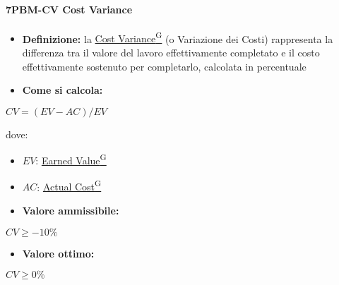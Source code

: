 \paragraph*{7PBM-CV Cost Variance}
\begin{itemize}
    \item \textbf{Definizione:} la \href{https://code7crusaders.github.io/docs/RTB/documentazione_interna/glossario.html#cost-variance}{Cost Variance\textsuperscript{G}} (o Variazione dei Costi) rappresenta la differenza tra il valore del lavoro effettivamente completato e il costo effettivamente sostenuto per completarlo, calcolata in percentuale
    \item \textbf{Come si calcola:}
\end{itemize}
\begin{center}
   $CV = (EV - AC)/EV$ 
\end{center}
dove:
\begin{itemize}[label=$\rightarrow$]
    \item $EV$: \href{https://code7crusaders.github.io/docs/RTB/documentazione_interna/glossario.html#earned-value}{Earned Value\textsuperscript{G}}
    \item $AC$: \href{https://code7crusaders.github.io/docs/RTB/documentazione_interna/glossario.html#actual-cost}{Actual Cost\textsuperscript{G}}
\end{itemize}
\begin{itemize}
    \item \textbf{Valore ammissibile:}
\end{itemize}
\begin{center}
    $CV \geq -10\%$
\end{center}
\begin{itemize}
    \item \textbf{Valore ottimo:}
\end{itemize}
\begin{center}
    $CV \geq 0\%$
\end{center}

